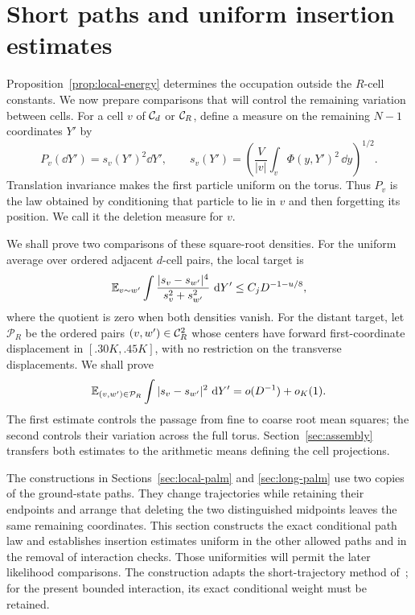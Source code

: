 \section{Short paths and uniform insertion estimates}\label{sec:paths}

Proposition~\ref{prop:local-energy} determines the occupation outside the
$R$-cell constants.  We now prepare comparisons that will control the
remaining variation between cells.  For a cell $v$ of $\mathcal C_d$ or
$\mathcal C_R$, define a measure on the remaining $N-1$ coordinates $Y'$ by
\begin{equation}\label{eq:palm-density}
 P_v(\dd Y')=s_v(Y')^2\dd Y',\qquad
 s_v(Y')=\left(\frac V{|v|}\int_v\Phi(y,Y')^2\,\dd y\right)^{1/2}.
\end{equation}
Translation invariance makes the first particle uniform on the torus.
Thus $P_v$ is the law obtained by conditioning that particle to lie in
$v$ and then forgetting its position.  We call it the deletion measure
for $v$.

We shall prove two comparisons of these square-root densities.  For the
uniform average over ordered adjacent $d$-cell pairs, the local target is
\begin{equation}\label{eq:local-fourth}
 \mathbb E_{v\sim w'}\int
        \frac{|s_v-s_{w'}|^4}{s_v^2+s_{w'}^2}\,\,\mathrm d Y'
                         \le C_jD^{-1-u/8},
\end{equation}
where the quotient is zero when both densities vanish.  For the distant
target, let $\mathcal P_R$ be the ordered pairs $(v,w')\in\mathcal C_R^2$
whose centers have forward first-coordinate displacement in
$[.30K,.45K]$, with no restriction on the transverse displacements.
We shall prove
\begin{equation}\label{eq:distant-comparison}
 \mathbb E_{(v,w')\in\mathcal P_R}\int |s_v-s_{w'}|^2\,\,\mathrm d Y'
       =o(D^{-1})+o_K(1).
\end{equation}
The first estimate controls the passage from fine to coarse root mean
squares; the second controls their variation across the full torus.
Section~\ref{sec:assembly} transfers both estimates to the arithmetic
means defining the cell projections.

The constructions in Sections~\ref{sec:local-palm} and
\ref{sec:long-palm} use two copies of the ground-state paths.  They
change trajectories while retaining their endpoints and arrange that
deleting the two distinguished midpoints leaves the same remaining
coordinates.  This section constructs the exact conditional path law and
establishes insertion estimates uniform in the other allowed paths and
in the removal of interaction checks.  Those uniformities will permit
the later likelihood comparisons.  The construction adapts the
short-trajectory method of~\cite[Section~5]{D}; for the present bounded
interaction, its exact conditional weight must be retained.

